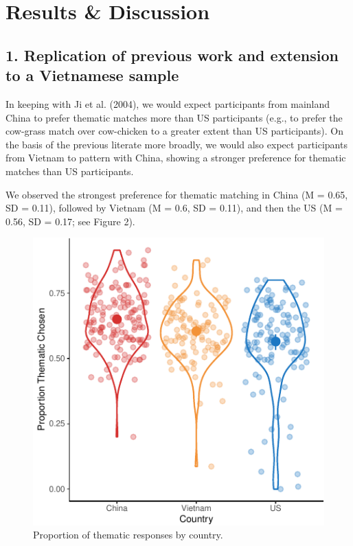 \documentclass[10pt, letterpaper]{article}
\newenvironment{CodeChunk}{}{}
\begin{document}
\hypertarget{results-discussion}{%
\section{Results \& Discussion}\label{results-discussion}}

\hypertarget{replication-of-previous-work-and-extension-to-a-vietnamese-sample}{%
\subsection{1. Replication of previous work and extension to a
Vietnamese
sample}\label{replication-of-previous-work-and-extension-to-a-vietnamese-sample}}

In keeping with Ji et al. (2004), we would expect participants from
mainland China to prefer thematic matches more than US participants
(e.g., to prefer the cow-grass match over cow-chicken to a greater
extent than US participants). On the basis of the previous literate more
broadly, we would also expect participants from Vietnam to pattern with
China, showing a stronger preference for thematic matches than US
participants.

We observed the strongest preference for thematic matching in China (M =
0.65, SD = 0.11), followed by Vietnam (M = 0.6, SD = 0.11), and then the
US (M = 0.56, SD = 0.17; see Figure 2).

\begin{CodeChunk}
\begin{figure}[tb]

{\centering \includegraphics{figs/unnamed-chunk-1-1} 

}

\caption[Proportion of thematic responses by country]{Proportion of thematic responses by country.}\label{fig:unnamed-chunk-1}
\end{figure}
\end{CodeChunk}
\end{document}
